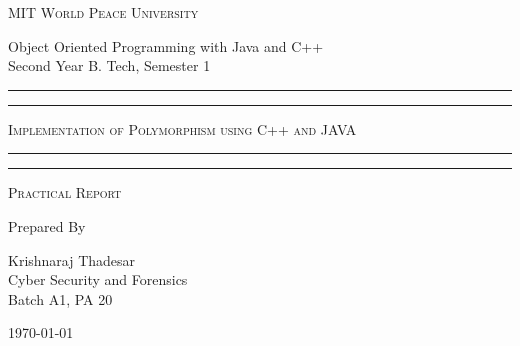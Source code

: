 \documentclass[11pt]{article}
\begin{document}
\begin{titlepage}
	\centering


	\huge\textsc{
		MIT World Peace University
	}\\

	\vspace{0.75\baselineskip} %

	\LARGE{
		Object Oriented Programming with Java and C++\\
		Second Year B. Tech, Semester 1
	}

	\vfill %


	\rule{\textwidth}{1.6pt}\vspace*{-\baselineskip}\vspace*{2pt}
	\rule{\textwidth}{0.6pt}
	\vspace{0.75\baselineskip} %



	\huge{\textsc{
			Implementation of Polymorphism using C++ and JAVA
		}} \\



	\vspace{0.5\baselineskip} %
	\rule{\textwidth}{0.6pt}\vspace*{-\baselineskip}\vspace*{2.8pt}
	\rule{\textwidth}{1.6pt}

	\vspace{1\baselineskip} %


	\LARGE\textsc{
		Practical Report
	} %
	\vfill


	Prepared By
	\vspace{0.5\baselineskip} %

	\Large{
		Krishnaraj Thadesar \\
		Cyber Security and Forensics\\
		Batch A1, PA 20
	}


	\vspace{0.5\baselineskip} %
	\today

\end{titlepage}
\end{document}
